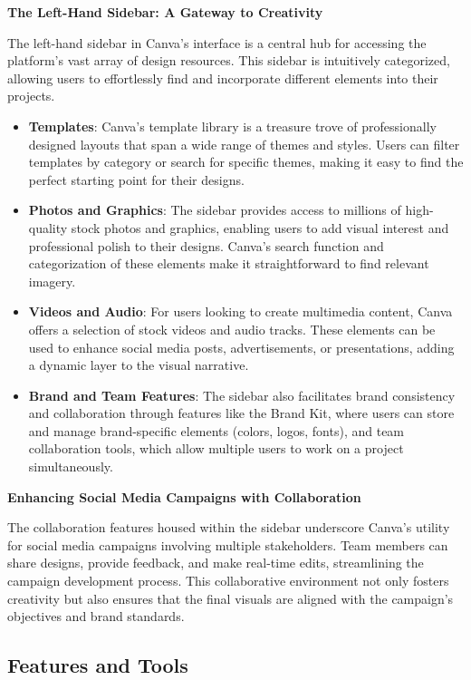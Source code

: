 \documentclass[
]{book}
\providecommand{\tightlist}{%
  \setlength{\itemsep}{0pt}\setlength{\parskip}{0pt}}
\begin{document}
\textbf{The Left-Hand Sidebar: A Gateway to Creativity}

The left-hand sidebar in Canva's interface is a central hub for accessing the platform's vast array of design resources. This sidebar is intuitively categorized, allowing users to effortlessly find and incorporate different elements into their projects.

\begin{itemize}
\tightlist
\item
  \textbf{Templates}: Canva's template library is a treasure trove of professionally designed layouts that span a wide range of themes and styles. Users can filter templates by category or search for specific themes, making it easy to find the perfect starting point for their designs.
\item
  \textbf{Photos and Graphics}: The sidebar provides access to millions of high-quality stock photos and graphics, enabling users to add visual interest and professional polish to their designs. Canva's search function and categorization of these elements make it straightforward to find relevant imagery.
\item
  \textbf{Videos and Audio}: For users looking to create multimedia content, Canva offers a selection of stock videos and audio tracks. These elements can be used to enhance social media posts, advertisements, or presentations, adding a dynamic layer to the visual narrative.
\item
  \textbf{Brand and Team Features}: The sidebar also facilitates brand consistency and collaboration through features like the Brand Kit, where users can store and manage brand-specific elements (colors, logos, fonts), and team collaboration tools, which allow multiple users to work on a project simultaneously.
\end{itemize}

\textbf{Enhancing Social Media Campaigns with Collaboration}

The collaboration features housed within the sidebar underscore Canva's utility for social media campaigns involving multiple stakeholders. Team members can share designs, provide feedback, and make real-time edits, streamlining the campaign development process. This collaborative environment not only fosters creativity but also ensures that the final visuals are aligned with the campaign's objectives and brand standards.

\hypertarget{features-and-tools}{%
\subsection*{Features and Tools}\label{features-and-tools}}
\end{document}
